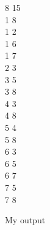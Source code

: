 \documentclass[14pt, a4paper]{article}
\begin{document}
\begin{enumerate}
\begin{enumerate}[label*=\arabic*]
\begin{tcolorbox}[enhanced jigsaw,breakable,pad at break*=1mm,colback=gray!10!white,frame hidden]
8 15 \\
1 8 \\
1 2 \\
1 6 \\
1 7 \\
2 3 \\
3 5 \\
3 8 \\
4 3 \\
4 8 \\
5 4 \\
5 8 \\
6 3 \\
6 5 \\
6 7 \\
7 5 \\
7 8
\end{tcolorbox}

My output


\end{enumerate}
\end{enumerate}
\end{document}
